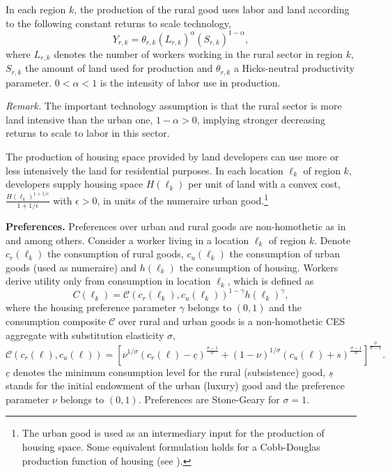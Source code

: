 \documentclass[20250130-paper.tex]{subfiles}
\begin{document}
In each region $k$, the production of the rural good uses labor and land according to the following constant returns to scale technology,
\begin{equation*}
Y_{r,k}=\theta_{r,k} (L_{r,k})^{\alpha}(S_{r,k})^{1-\alpha},
\end{equation*}
where $L_{r,k}$ denotes the number of workers working in the rural sector in region $k$, $S_{r,k}$ the amount of land used for production and $\theta_{r,k}$ a Hicks-neutral productivity parameter. $0<\alpha<1$ is the intensity of labor use in production. %

\textit{Remark.} The important technology assumption is that the rural sector is more land intensive than the urban one,  $1-\alpha>0$, implying stronger decreasing returns to scale to labor in this sector. %

The production of housing space provided by land developers can use more or less intensively the land for residential purposes. In each location $\ell_k$ of region $k$, developers supply housing space $H(\ell_k)$ per unit of land with a convex cost, $\frac{H(\ell_k)^{1+1/\epsilon}}{1+1/\epsilon}$ with $\epsilon>0$, in units of the numeraire urban good.\footnote{The urban good is used as an intermediary input for the production of housing space. Some equivalent formulation holds for a Cobb-Douglas production function of housing (see \cite{combes2018costs}).} 

\textbf{Preferences.} Preferences over urban and rural goods are non-homothetic as in \cite{kongsamut} and \cite{herrendorf2013aer} among others. Consider a worker living in a location $\ell_k$ of region $k$. Denote $c_r(\ell_k)$ the consumption of rural goods, $c_u(\ell_k)$ the consumption of urban goods (used as numeraire) and $h(\ell_k)$ the consumption of
housing. Workers derive utility only from consumption in location $\ell_k$, which is defined as
\begin{equation}
C(\ell_k)=\mathcal{C}\left(c_{r}(\ell_k), c_{u}(\ell_k) \right)^{1-\gamma}h(\ell_k)^\gamma, \label{eq:U}
\end{equation}
where the housing preference parameter $\gamma$ belongs to $(0,1)$ and the consumption composite $\mathcal{C}$ over rural and urban goods is a non-homothetic CES aggregate with substitution elasticity $\sigma$,
\begin{equation*}
\mathcal{C}\left(c_{r}(\ell), c_{u}(\ell)\right) =\left[\nu^{1/\sigma}\left(c_{r}(\ell)-\underline{c}\right)^{\frac{\sigma-1}{\sigma}}+(1-\nu)^{1/\sigma}\left(c_{u}(\ell)+s\right)^{\frac{\sigma-1}{\sigma}}\right]^{\frac{\sigma}{\sigma-1}}. \label{eq:C}
\end{equation*}
$\underline{c}$ denotes the minimum consumption level for the rural (subsistence) good, $\underline{s}$ stands for the initial endowment of the urban (luxury) good and the preference parameter $\nu$ belongs to $(0,1)$. Preferences are Stone-Geary for $\sigma=1$. 
\end{document}
